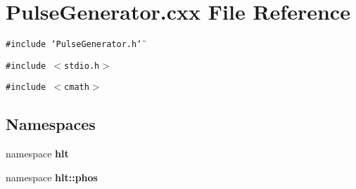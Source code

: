 \section{Pulse\-Generator.cxx File Reference}
\label{PulseGenerator_8cxx}
{\tt \#include \char`\"{}Pulse\-Generator.h\char`\"{}}\par
{\tt \#include $<$stdio.h$>$}\par
{\tt \#include $<$cmath$>$}\par
\subsection*{Namespaces}
\begin{CompactItemize}
\item 
namespace {\bf hlt}
\item 
namespace {\bf hlt::phos}
\end{CompactItemize}
